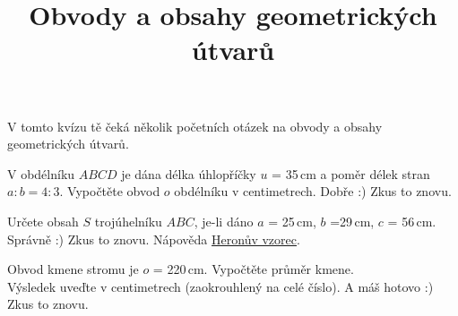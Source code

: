 \documentclass[language = czech]{webquiz}
\title{Obvody a obsahy geometrických útvarů}
\begin{document}
	
	\begin{discussion}[Úvod] 
		V tomto kvízu tě čeká několik početních otázek na obvody a obsahy geometrických útvarů. 
	\end{discussion}
	
	\begin{question} \label{q1} %
		V obdélníku $ABCD$ je dána délka úhlopříčky $u$ = 35\,cm a poměr délek stran $a:b=4:3$. Vypočtěte obvod $o$ obdélníku v centimetrech.
		\whenRight Dobře :) 
		\whenWrong Zkus to znovu.
	\end{question}
	
	\begin{question}\label{q2} %
		Určete obsah $S$ trojúhelníku $ABC$, je-li dáno $a$ = 25\,cm, $b$ =29\,cm, $c$ = 56\,cm.
		\whenRight Správně :) 
		\whenWrong Zkus to znovu. Nápověda \href{https://www.youtube.com/watch?v=MKF_y4hZxSw}{Heronův vzorec}.
	\end{question}
	
	\begin{question} \label{q3}%
		Obvod kmene stromu je $o$ = 220\,cm. Vypočtěte průměr kmene.\\ Výsledek uveďte v centimetrech (zaokrouhlený na celé číslo).
		\whenRight A máš hotovo :)
		\whenWrong Zkus to znovu.
	\end{question}
	
\end{document}
